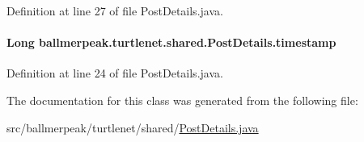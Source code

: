 Definition at line 27 of file Post\-Details.\-java.

\hypertarget{classballmerpeak_1_1turtlenet_1_1shared_1_1PostDetails_a0602043b91650f4eec3d4b71175b7362}{
\paragraph[{timestamp}]{\setlength{\rightskip}{0pt plus 5cm}Long ballmerpeak.\-turtlenet.\-shared.\-Post\-Details.\-timestamp}}\label{classballmerpeak_1_1turtlenet_1_1shared_1_1PostDetails_a0602043b91650f4eec3d4b71175b7362}


Definition at line 24 of file Post\-Details.\-java.



The documentation for this class was generated from the following file\-:\begin{DoxyCompactItemize}
\item 
src/ballmerpeak/turtlenet/shared/\hyperlink{PostDetails_8java}{Post\-Details.\-java}\end{DoxyCompactItemize}
